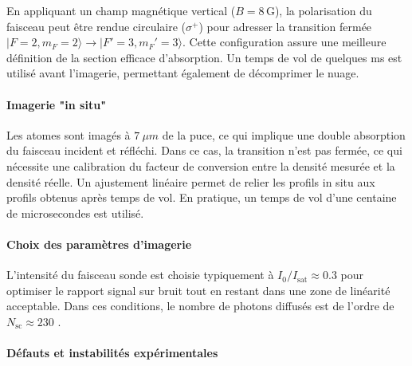 En appliquant un champ magnétique vertical (\( B = 8\,\mathrm{G} \)), la polarisation du faisceau peut être rendue circulaire (\( \sigma^+ \)) pour adresser la transition fermée \( |F=2, m_F=2\rangle \rightarrow |F'=3, m_F'=3\rangle \). Cette configuration assure une meilleure définition de la section efficace d’absorption. Un temps de vol de quelques ms est utilisé avant l’imagerie, permettant également de décomprimer le nuage.

\paragraph{Imagerie "in situ"}
Les atomes sont imagés à $7~\mu m$ de la puce, ce qui implique une double absorption du faisceau incident et réfléchi. Dans ce cas, la transition n’est pas fermée, ce qui nécessite une calibration du facteur de conversion entre la densité mesurée et la densité réelle. Un ajustement linéaire permet de relier les profils in situ aux profils obtenus après temps de vol. En pratique, un temps de vol d’une centaine de microsecondes est utilisé. 

\paragraph{Choix des paramètres d’imagerie}

L’intensité du faisceau sonde est choisie typiquement à \( I_0/I_{\mathrm{sat}} \approx 0.3 \) pour optimiser le rapport signal sur bruit tout en restant dans une zone de linéarité acceptable. Dans ces conditions, le nombre de photons diffusés est de l’ordre de \( N_{\mathrm{sc}} \approx 230 \) .%

%

\paragraph{Défauts et instabilités expérimentales}

